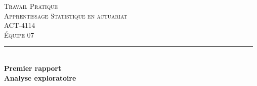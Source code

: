 %
%

\begin{titlepage}

\newcommand{\HRule}{\rule{\linewidth}{0.5mm}} %

\center %
\textsc{\LARGE Travail Pratique}\\[1.0cm] %
\textsc{\Large Apprentissage Statistique en actuariat}\\[0.2cm] %
\textsc{\large ACT-4114}\\[0.7cm] %
\textsc{\large Équipe 07}\\[0.7cm] %


\HRule \\[0.4cm]
{ \Large \bfseries Premier rapport}\\[0.20cm] { \huge \bfseries Analyse exploratoire}\\[0.20cm]


\end{titlepage}
